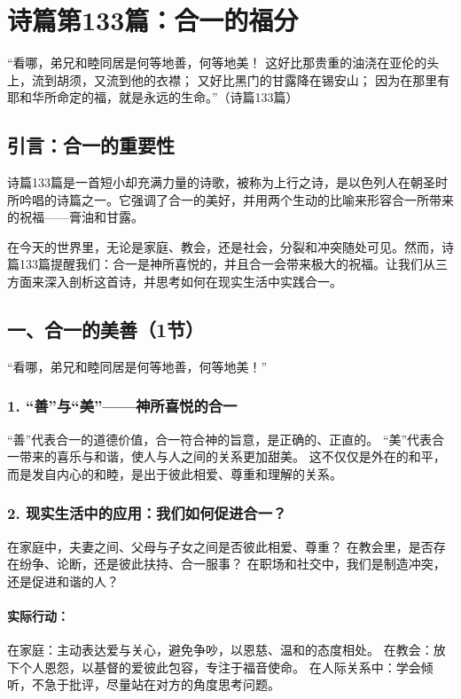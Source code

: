 \documentclass[a4paper, 12pt]{article}
\begin{document}
\section{诗篇第133篇：合一的福分}


“看哪，弟兄和睦同居是何等地善，何等地美！
这好比那贵重的油浇在亚伦的头上，流到胡须，又流到他的衣襟；
又好比黑门的甘露降在锡安山；
因为在那里有耶和华所命定的福，就是永远的生命。”（诗篇133篇）

\subsection*{引言：合一的重要性}
\hspace{0.6cm}诗篇133篇是一首短小却充满力量的诗歌，被称为上行之诗，是以色列人在朝圣时所吟唱的诗篇之一。它强调了合一的美好，并用两个生动的比喻来形容合一所带来的祝福——膏油和甘露。

在今天的世界里，无论是家庭、教会，还是社会，分裂和冲突随处可见。然而，诗篇133篇提醒我们：合一是神所喜悦的，并且合一会带来极大的祝福。让我们从三方面来深入剖析这首诗，并思考如何在现实生活中实践合一。

\subsection*{一、合一的美善（1节）}
“看哪，弟兄和睦同居是何等地善，何等地美！”

\subsubsection*{1. “善”与“美”——神所喜悦的合一}
“善”代表合一的道德价值，合一符合神的旨意，是正确的、正直的。
“美”代表合一带来的喜乐与和谐，使人与人之间的关系更加甜美。
这不仅仅是外在的和平，而是发自内心的和睦，是出于彼此相爱、尊重和理解的关系。
\subsubsection*{2. 现实生活中的应用：我们如何促进合一？}
在家庭中，夫妻之间、父母与子女之间是否彼此相爱、尊重？
在教会里，是否存在纷争、论断，还是彼此扶持、合一服事？
在职场和社交中，我们是制造冲突，还是促进和谐的人？
\paragraph*{实际行动：}

在家庭：主动表达爱与关心，避免争吵，以恩慈、温和的态度相处。
在教会：放下个人恩怨，以基督的爱彼此包容，专注于福音使命。
在人际关系中：学会倾听，不急于批评，尽量站在对方的角度思考问题。
\end{document}
